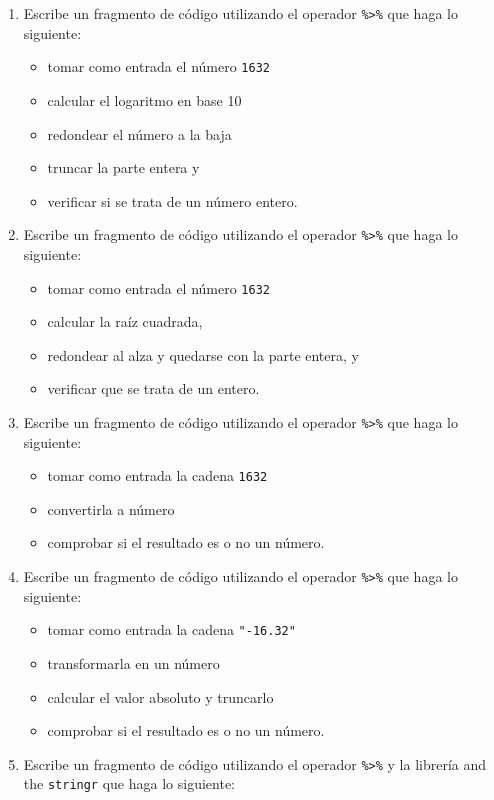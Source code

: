\documentclass[
]{book}
\providecommand{\tightlist}{%
  \setlength{\itemsep}{0pt}\setlength{\parskip}{0pt}}
\begin{document}
\begin{enumerate}
\def\labelenumi{\arabic{enumi}.}
\tightlist
\item
  Escribe un fragmento de código utilizando el operador \texttt{\%\textgreater{}\%} que haga lo siguiente:

  \begin{itemize}
  \tightlist
  \item
    tomar como entrada el número \texttt{1632}
  \item
    calcular el logaritmo en base 10
  \item
    redondear el número a la baja
  \item
    truncar la parte entera y
  \item
    verificar si se trata de un número entero.
  \end{itemize}
\item
  Escribe un fragmento de código utilizando el operador \texttt{\%\textgreater{}\%} que haga lo siguiente:

  \begin{itemize}
  \tightlist
  \item
    tomar como entrada el número \texttt{1632}
  \item
    calcular la raíz cuadrada,
  \item
    redondear al alza y quedarse con la parte entera, y
  \item
    verificar que se trata de un entero.
  \end{itemize}
\item
  Escribe un fragmento de código utilizando el operador \texttt{\%\textgreater{}\%} que haga lo siguiente:

  \begin{itemize}
  \tightlist
  \item
    tomar como entrada la cadena \texttt{1632}
  \item
    convertirla a número
  \item
    comprobar si el resultado es o no un número.
  \end{itemize}
\item
  Escribe un fragmento de código utilizando el operador \texttt{\%\textgreater{}\%} que haga lo siguiente:

  \begin{itemize}
  \tightlist
  \item
    tomar como entrada la cadena \texttt{"-16.32"}
  \item
    transformarla en un número
  \item
    calcular el valor absoluto y truncarlo
  \item
    comprobar si el resultado es o no un número.
  \end{itemize}
\item
  Escribe un fragmento de código utilizando el operador \texttt{\%\textgreater{}\%} y la librería and the \texttt{stringr} que haga lo siguiente:


\end{enumerate}
\end{document}
